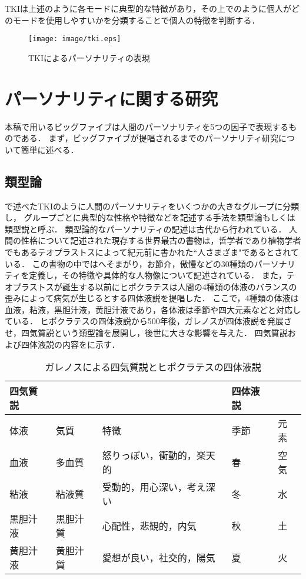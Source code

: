 TKIは上述のように各モードに典型的な特徴があり，その上でのように個人がどのモードを使用しやすいかを分類することで個人の特徴を判断する．
\begin{figure}[htb]
    \centering
    \texttt{[image: image/tki.eps]}
    \caption{TKIによるパーソナリティの表現}
    \label{fig:tki}
\end{figure}

\section{パーソナリティに関する研究}
\label{sec:personality}
本稿で用いるビッグファイブは人間のパーソナリティを5つの因子で表現するものである．
まず，ビッグファイブが提唱されるまでのパーソナリティ研究について簡単に述べる\cite{big5-history, psychology, first-personality,daniel}．

\subsection{類型論}
で述べたTKIのように人間のパーソナリティをいくつかの大きなグループに分類し，
グループごとに典型的な性格や特徴などを記述する手法を類型論もしくは類型説と呼ぶ．
類型論的なパーソナリティの記述は古代から行われている．
人間の性格について記述された現存する世界最古の書物は，哲学者であり植物学者でもあるテオプラストスによって紀元前に書かれた“人さまざま"であるとされている．
この書物の中ではへそまがり，お節介，傲慢などの30種類のパーソナリティを定義し，その特徴や具体的な人物像について記述されている\cite{theophrastus}．
また，テオプラストスが誕生する以前にヒポクラテスは人間の4種類の体液のバランスの歪みによって病気が生じるとする四体液説を提唱した\cite{hippocrates}．
ここで，4種類の体液は血液，粘液，黒胆汁液，黄胆汁液であり，各体液は季節や四大元素などと対応している．
ヒポクラテスの四体液説から500年後，ガレノスが四体液説を発展させ，四気質説という類型論を展開し，後世に大きな影響を与えた\cite{smith}．
四気質説および四体液説の内容をに示す．

\begin{table}[htb]
    \centering
    \caption{ガレノスによる四気質説とヒポクラテスの四体液説 \protect \footnotemark}
    \begin{tabular}{lllll} \toprule
        四気質説 & & & 四体液説 & \\ \midrule
        体液 & 気質 & 特徴 & 季節 & 元素\\ \midrule
        血液 & 多血質 & 怒りっぽい，衝動的，楽天的 & 春 & 空気 \\
        粘液 & 粘液質 & 受動的，用心深い，考え深い & 冬 & 水 \\
        黒胆汁液 & 黒胆汁質 & 心配性，悲観的，内気 & 秋 & 土 \\
        黄胆汁液 & 黄胆汁質 & 愛想が良い，社交的，陽気 & 夏 & 火 \\ \bottomrule
    \end{tabular}
    \label{tab:galenos}
\end{table}

